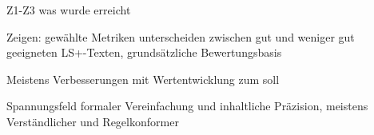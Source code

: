 
Z1-Z3 was wurde erreicht

Zeigen:
gewählte Metriken unterscheiden zwischen gut und weniger gut geeigneten LS+-Texten, grundsätzliche Bewertungsbasis

Meistens Verbesserungen mit Wertentwicklung zum soll

Spannungsfeld formaler Vereinfachung und inhaltliche Präzision, meistens Verständlicher und Regelkonformer